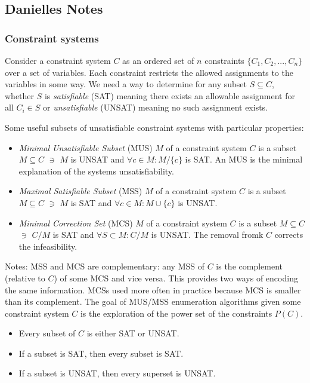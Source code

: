 \subsection{Danielles Notes}

\subsubsection{Constraint systems}
Consider a constraint system $C$ as an ordered set of $n$ constraints $\{C_1,C_2,...,C_n\}$ over a set of variables. Each constraint restricts the allowed assignments to the variables in some way. We need a way to determine for any subset $S \subseteq C$, whether $S$ is \textit{satisfiable} (SAT) meaning there exists an allowable assignment for all $C_i \in S$ or \textit{unsatisfiable} (UNSAT) meaning no such assignment exists. 

Some useful subsets of unsatisfiable constraint systems with particular properties:
\begin{itemize}
\item \textit{Minimal Unsatisfiable Subset} (MUS) $M$ of a constraint system $C$ is a subset $M \subseteq C$ $\ni$ $M$ is UNSAT and $\forall c \in M : M / \{c\}$ is SAT. An MUS is the minimal explanation of the systems unsatisfiability. 
 
\item \textit{Maximal Satisfiable Subset} (MSS) $M$ of a constraint system $C$ is a subset $M \subseteq C$ $\ni$ $M$ is SAT and $\forall c \in M : M \cup \{c\}$ is UNSAT.

\item \textit{Minimal Correction Set} (MCS) $M$ of a constraint system $C$ is a subset $M \subseteq C$ $\ni$ $C / M$ is SAT and $\forall S \subset M : C / M$ is UNSAT. The removal fromk $C$ corrects the infeasibility. 

\end{itemize}

Notes: MSS and MCS are complementary: any MSS of $C$ is the complement (relative to $C$) of some MCS and vice versa. This provides two ways of encoding the same information. MCSs used more often in practice because MCS is smaller than its complement. The goal of MUS/MSS enumeration algorithms given some constraint system $C$ is the exploration of the power set of the constraints $P(C)$. 
\begin{itemize}
\item Every subset of $C$ is either SAT or UNSAT.

\item If a subset is SAT, then every subset is SAT. 

\item If a subset is UNSAT, then every superset is UNSAT. 

\end{itemize}

